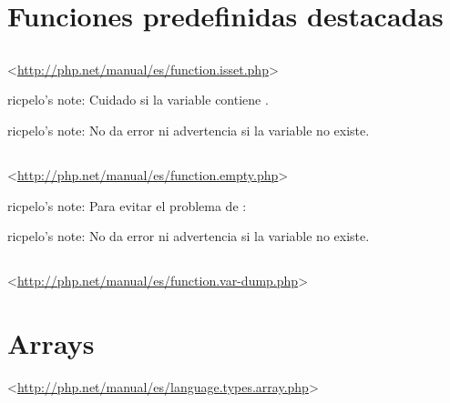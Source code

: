 \documentclass[a4paper,11pt,spanish]{sphinxmanual}
\begin{document}
\section{Funciones predefinidas destacadas}
\label{\detokenize{php:funciones-predefinidas-destacadas}}

\subsection{}
\label{\detokenize{php:isset}}
\textless{}\url{http://php.net/manual/es/function.isset.php}\textgreater{}

\begin{DUlineblock}{0em}
\item[] ricpelo's note: Cuidado si la variable contiene .
\item[] ricpelo's note: No da error ni advertencia si la variable no existe.
\end{DUlineblock}


\subsection{}
\label{\detokenize{php:empty}}
\textless{}\url{http://php.net/manual/es/function.empty.php}\textgreater{}

ricpelo's note: Para evitar el problema de :

\begin{sphinxVerbatim}[commandchars=\\\{\}]
  
       
\end{sphinxVerbatim}

ricpelo's note: No da error ni advertencia si la variable no existe.


\subsection{}
\label{\detokenize{php:var-dump}}
\textless{}\url{http://php.net/manual/es/function.var-dump.php}\textgreater{}


\section{Arrays}
\label{\detokenize{php:arrays}}
\textless{}\url{http://php.net/manual/es/language.types.array.php}\textgreater{}
\end{document}

